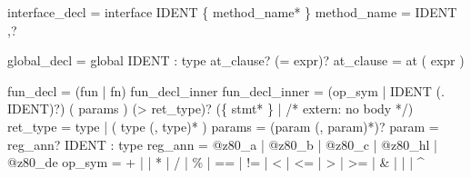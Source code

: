 \documentclass[
  11pt,
]{article}
\newenvironment{Shaded}{\begin{snugshade}}{\end{snugshade}}
\newcommand{\NormalTok}[1]{#1}
\begin{document}
\begin{Shaded}
\begin{Highlighting}[]
\NormalTok{interface\_decl = \textquotesingle{}interface\textquotesingle{} IDENT \textquotesingle{}\{\textquotesingle{} method\_name* \textquotesingle{}\}\textquotesingle{}}
\NormalTok{method\_name    = IDENT \textquotesingle{},\textquotesingle{}?}

\NormalTok{global\_decl    = \textquotesingle{}global\textquotesingle{} IDENT \textquotesingle{}:\textquotesingle{} type at\_clause? (\textquotesingle{}=\textquotesingle{} expr)?}
\NormalTok{at\_clause      = \textquotesingle{}at\textquotesingle{} \textquotesingle{}(\textquotesingle{} expr \textquotesingle{})\textquotesingle{}}

\NormalTok{fun\_decl       = (\textquotesingle{}fun\textquotesingle{} | \textquotesingle{}fn\textquotesingle{}) fun\_decl\_inner}
\NormalTok{fun\_decl\_inner = (op\_sym | IDENT (\textquotesingle{}.\textquotesingle{} IDENT)?) \textquotesingle{}(\textquotesingle{} params \textquotesingle{})\textquotesingle{} (\textquotesingle{}{-}\textgreater{}\textquotesingle{} ret\_type)?}
\NormalTok{                 (\textquotesingle{}\{\textquotesingle{} stmt* \textquotesingle{}\}\textquotesingle{} | /* extern: no body */)}
\NormalTok{ret\_type       = type | \textquotesingle{}(\textquotesingle{} type (\textquotesingle{},\textquotesingle{} type)* \textquotesingle{})\textquotesingle{}}
\NormalTok{params         = (param (\textquotesingle{},\textquotesingle{} param)*)?}
\NormalTok{param          = reg\_ann? IDENT \textquotesingle{}:\textquotesingle{} type}
\NormalTok{reg\_ann        = \textquotesingle{}@z80\_a\textquotesingle{} | \textquotesingle{}@z80\_b\textquotesingle{} | \textquotesingle{}@z80\_c\textquotesingle{} | \textquotesingle{}@z80\_hl\textquotesingle{} | \textquotesingle{}@z80\_de\textquotesingle{}}
\NormalTok{op\_sym         = \textquotesingle{}+\textquotesingle{} | \textquotesingle{}{-}\textquotesingle{} | \textquotesingle{}*\textquotesingle{} | \textquotesingle{}/\textquotesingle{} | \textquotesingle{}\%\textquotesingle{} | \textquotesingle{}==\textquotesingle{} | \textquotesingle{}!=\textquotesingle{} | \textquotesingle{}\textless{}\textquotesingle{} | \textquotesingle{}\textless{}=\textquotesingle{}}
\NormalTok{               | \textquotesingle{}\textgreater{}\textquotesingle{} | \textquotesingle{}\textgreater{}=\textquotesingle{} | \textquotesingle{}\&\textquotesingle{} | \textquotesingle{}|\textquotesingle{} | \textquotesingle{}\^{}\textquotesingle{}}


\end{Highlighting}
\end{Shaded}
\end{document}
